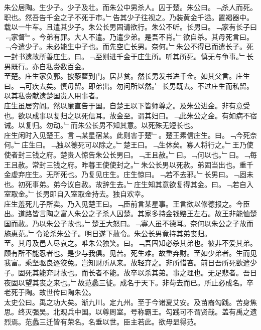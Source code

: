 \documentclass{zhvt-classic}
\begin{document}
\hspace*{2em}朱公居陶。生少子。少子及壮。而朱公中男杀人。囚于楚。朱公曰。﹁杀人而死。职也。然吾告千金之子不死于市。﹂告其少子往视之。乃装黄金千溢。置褐器中。载以一牛车。且遣其少子。朱公长男固请欲行。朱公不听。长男曰。﹁家有长子曰﹃家督﹄。今弟有罪。大人不遣。乃遣少弟。是吾不肖。﹂欲自杀。其母死言曰。﹁今遣少子。未必能生中子也。而先空亡长男。奈何。﹂朱公不得已而遣长子。死一封书遗故所善庄生。曰。﹁至则进千金于庄生所。听其所死。慎无与争事。﹂长男既行。亦自私赍数百金。\\
\hspace*{2em}至楚。庄生家负郭。披藜藋到门。居甚贫。然长男发书进千金。如其父言。庄生曰。﹁可疾去矣。慎毋留。即弟出。勿问所以然。﹂长男既去。不过庄生而私留。以其私赍献遗楚国贵人用事者。\\
\hspace*{2em}庄生虽居穷阎。然以廉直告于国。自楚王以下皆师尊之。及朱公进金。非有意受也。欲以成事以复归之以死信耳。故金至。谓其妇曰。﹁此朱公之金。有如病不宿诫。以复归。勿动。﹂而朱公长男不知其意。以死殊无短长也。\\
\hspace*{2em}庄生闲时入见楚王。言﹁某星宿某。此则害于楚﹂。楚王素信庄生。曰。﹁今死奈何。﹂庄生曰。﹁独以德死可以除之。﹂楚王曰。﹁生休矣。寡人将行之。﹂王乃使使者封三钱之府。楚贵人惊告朱公长男曰。﹁王且赦。﹂曰。﹁何以也。﹂曰。﹁每王且赦。常封三钱之府。昨暮王使使封之。﹂朱公长男以死赦。弟固当出也。重千金虚弃庄生。无所死也。乃复见庄生。庄生惊曰。﹁若不去邪。﹂长男曰。﹁固未也。初死事弟。弟今议自赦。故辞生去。﹂庄生知其意欲复得其金。曰。﹁若自入室取金。﹂长男即自入室取金持去。独自欢幸。\\
\hspace*{2em}庄生羞死儿子所卖。乃入见楚王曰。﹁臣前言某星事。王言欲以修德报之。今臣出。道路皆言陶之富人朱公之子杀人囚楚。其家多持金钱赂王左右。故王非能恤楚国而赦。乃以朱公子故也。﹂楚王大怒曰。﹁寡人虽不德耳。奈何以朱公之子故而施惠范。﹂令论杀朱公子。明日遂下赦令。朱公长男竟持其弟丧归。\\
\hspace*{2em}至。其母及邑人尽哀之。唯朱公独笑。曰。﹁吾固知必杀其弟也。彼非不爱其弟。顾有所不能忍者也。是少与我俱。见苦。死生难。故重弃财。至如少弟者。生而见我富。乘坚驱良逐狡兔。岂知财所从来。故轻弃之。非所惜吝。前日吾所死欲遣少子。固死其能弃财故也。而长者不能。故卒以杀其弟。事之理也。无足悲者。吾日夜固以望其丧之来也。﹂故范蠡三徙。成名于天下。非苟去而已。所止必成名。卒老死于陶。故世传曰陶朱公。\\
\hspace*{2em}太史公曰。禹之功大矣。渐九川。定九州。至于今诸夏艾安。及苗裔勾践。苦身焦思。终灭强吴。北观兵中国。以尊周室。号称霸王。勾践可不谓贤哉。盖有禹之遗烈焉。范蠡三迁皆有荣名。名垂以世。臣主若此。欲毋显得范。\\
\end{document}
